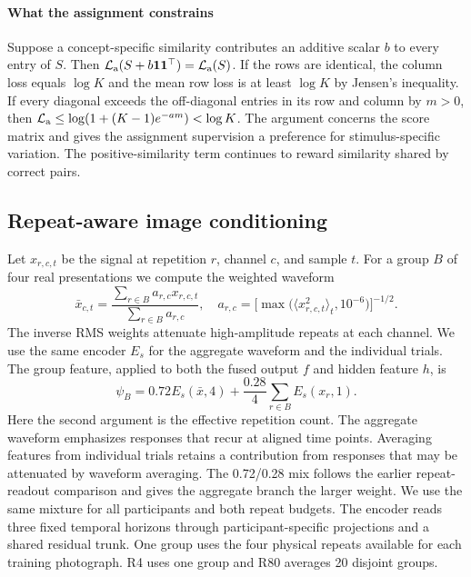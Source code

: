 \documentclass[letterpaper,10pt,conference]{IEEEtran}
\begin{document}
\paragraph{What the assignment constrains}
Suppose a concept-specific similarity contributes an additive scalar \(b\) to every entry of \(S\). Then \(\mathcal L_{\rm a}(S+b\mathbf 1\mathbf 1^\top)=\mathcal L_{\rm a}(S)\). If the rows are identical, the column loss equals \(\log K\) and the mean row loss is at least \(\log K\) by Jensen's inequality. If every diagonal exceeds the off-diagonal entries in its row and column by \(m>0\), then \(\mathcal L_{\rm a}\leq\log(1+(K-1)e^{-am})<\log K\). The argument concerns the score matrix and gives the assignment supervision a preference for stimulus-specific variation. The positive-similarity term continues to reward similarity shared by correct pairs.

\subsection{Repeat-aware image conditioning}

Let \(x_{r,c,t}\) be the signal at repetition \(r\), channel \(c\), and sample \(t\). For a group \(B\) of four real presentations we compute the weighted waveform
\begin{equation}
\bar x_{c,t}=\frac{\sum_{r\in B}a_{r,c}x_{r,c,t}}{\sum_{r\in B}a_{r,c}},
\quad
a_{r,c}=\big[\max\big(\langle x_{r,c,t}^{2}\rangle_t,10^{-6}\big)\big]^{-1/2}.
\label{eq:repeat}
\end{equation}
The inverse RMS weights attenuate high-amplitude repeats at each channel. We use the same encoder \(E_s\) for the aggregate waveform and the individual trials. The group feature, applied to both the fused output \(f\) and hidden feature \(h\), is
\begin{equation}
\psi_B=0.72 E_s(\bar x,4)+\frac{0.28}{4}\sum_{r\in B}E_s(x_r,1).
\label{eq:fusion}
\end{equation}
Here the second argument is the effective repetition count. The aggregate waveform emphasizes responses that recur at aligned time points. Averaging features from individual trials retains a contribution from responses that may be attenuated by waveform averaging. The 0.72/0.28 mix follows the earlier repeat-readout comparison and gives the aggregate branch the larger weight. We use the same mixture for all participants and both repeat budgets. The encoder reads three fixed temporal horizons through participant-specific projections and a shared residual trunk. One group uses the four physical repeats available for each training photograph. R4 uses one group and R80 averages 20 disjoint groups.
\end{document}
